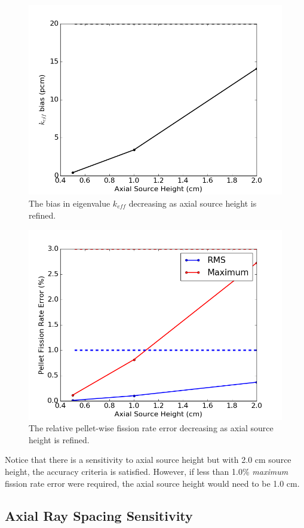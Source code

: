 \begin{figure}[h!]
	\centering
	\includegraphics[width=0.65\linewidth]{figures/results/sensitivity/source_height_pcm.png}
	\caption[]{The bias in eigenvalue $k_{\textit{eff}}$ decreasing as axial source height is refined.}
	\label{fig:axial-sh-pcm}
\end{figure}
\begin{figure}[h!]
	\centering
	\includegraphics[width=0.65\linewidth]{figures/results/sensitivity/source_height_fr.png}
	\caption[]{The relative pellet-wise fission rate error decreasing as axial source height is refined.}
	\label{fig:axial-sh-fr}
\end{figure}

Notice that there is a sensitivity to axial source height but with 2.0 cm source height, the accuracy criteria is satisfied. However, if less than 1.0\% \textit{maximum} fission rate error were required, the axial source height would need to be 1.0 cm.

\subsection{Axial Ray Spacing Sensitivity}
\label{sec:axial-ray-spacing-sensitivity}

